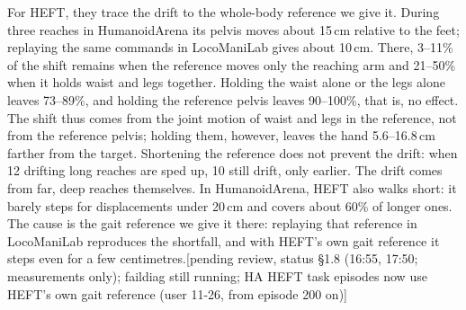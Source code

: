 \documentclass[conference]{IEEEtran}
\newif\ifdraft \drafttrue
\newcommand{\dnote}[1]{\ifdraft{\color{red}\footnotesize[#1]}\fi}
\begin{document}
For HEFT, they trace the drift to the whole-body reference we give it. During three reaches in HumanoidArena its pelvis moves about 15\,cm relative to the feet; replaying the same commands in LocoManiLab gives about 10\,cm. There, 3--11\% of the shift remains when the reference moves only the reaching arm and 21--50\% when it holds waist and legs together. Holding the waist alone or the legs alone leaves 73--89\%, and holding the reference pelvis leaves 90--100\%, that is, no effect. The shift thus comes from the joint motion of waist and legs in the reference, not from the reference pelvis; holding them, however, leaves the hand 5.6--16.8\,cm farther from the target. Shortening the reference does not prevent the drift: when 12 drifting long reaches are sped up, 10 still drift, only earlier. The drift comes from far, deep reaches themselves. In HumanoidArena, HEFT also walks short: it barely steps for displacements under 20\,cm and covers about 60\% of longer ones. The cause is the gait reference we give it there: replaying that reference in LocoManiLab reproduces the shortfall, and with HEFT's own gait reference it steps even for a few centimetres.\dnote{pending review, status §1.8 (16:55, 17:50; measurements only); faildiag still running; HA HEFT task episodes now use HEFT's own gait reference (user 11-26, from episode 200 on)}
\end{document}
